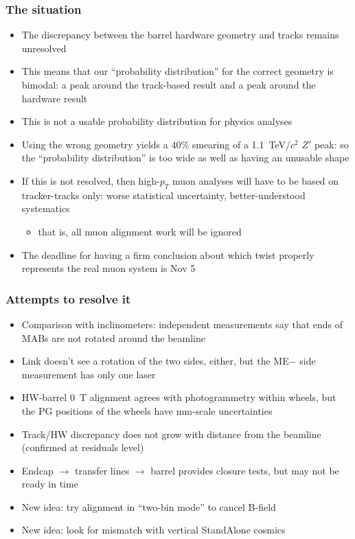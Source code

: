 \documentclass[compress]{beamer}
\begin{document}
\begin{frame}
\frametitle{The situation}
\begin{itemize}
\item The discrepancy between the barrel hardware geometry and tracks remains unresolved
\item This means that our ``probability distribution'' for the correct geometry is bimodal: a peak around the track-based result and a peak around the hardware result
\item This is not a usable probability distribution for physics analyses
\item Using the wrong geometry yields a 40\% smearing of a 1.1~TeV/$c^2$ $Z'$ peak: so the ``probability distribution'' is too wide as well as having an unusable shape
\item If this is not resolved, then high-$p_T$ muon analyses will have to be based on tracker-tracks only: worse statistical uncertainty, better-understood systematics
\begin{itemize}
\item that is, all muon alignment work will be ignored
\end{itemize}
\item The deadline for having a firm conclusion about which twist properly represents the real muon system is Nov 5
\end{itemize}
\end{frame}

\begin{frame}
\frametitle{Attempts to resolve it}
\begin{itemize}
\item Comparison with inclinometers: independent measurements say that ends of MABs are not rotated around the beamline
\item Link doesn't see a rotation of the two sides, either, but the ME$-$ side measurement has only one laser
\item HW-barrel 0~T alignment agrees with photogrammetry within wheels, but the PG positions of the wheels have mm-scale uncertainties
\item Track/HW discrepancy does not grow with distance from the beamline (confirmed at residuals level)
\item Endcap $\to$ transfer lines $\to$ barrel provides closure tests, but may not be ready in time
\item New idea: try alignment in ``two-bin mode'' to cancel B-field
\item New idea: look for mismatch with vertical StandAlone cosmics
\end{itemize}
\end{frame}
\end{document}
